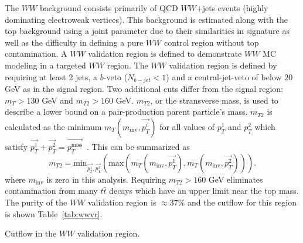 The $WW$ background consists primarily of QCD $WW$+jets events (highly dominating electroweak vertices). This background is estimated along with the top background using a joint parameter due to their similarities in signature as well as the difficulty in defining a pure $WW$ control region without top contamination. A $WW$ validation region is defined to demonstrate $WW$ MC modeling in a targeted $WW$ region.  The $WW$ validation region is defined by requiring at least 2 jets, a $b$-veto ($N_{b-jet}<1$) and a central-jet-veto of below $20$ GeV as in the signal region. Two additional cuts differ from the signal region: $m_T>130$ GeV and $m_{T2}>160$ GeV. $m_{T2}$, or the stransverse mass, is used to describe a lower bound on a pair-production parent particle's mass. $m_{T2}$ is calculated as the minimum $m_T(m_{\text{inv}},\vec{p_T^i})$ for all values of $p_T^1$ and $p_T^2$ which satisfy $\vec{p_T^1}+\vec{p_T^2}=\vec{p_T^{\text{miss}}}$~\cite{MT2}. This can be summarized as
\begin{equation}
m_{T2}=\text{min}_{\vec{p_T^1},\vec{p_T^2}}(\text{max}(m_T(m_{\text{inv}},\vec{p_T^1}),m_T(m_{\text{inv}},\vec{p_T^2}))).
\end{equation}
where $m_{\text{inv}}$ is zero in this analysis. Requiring $m_{T2}>160$ GeV eliminates contamination from many $t\bar{t}$ decays which have an upper limit near the top mass. The purity of the $WW$ validation region is $\approx 37\%$ and the cutflow for this region is shown Table~\ref{tab:wwvr}.

\begin{table}[h!]
\centering
\scalebox{0.60}{

}
\caption{Cutflow in the $WW$ validation region.}
\label{tab:wwvr}
\end{table}


